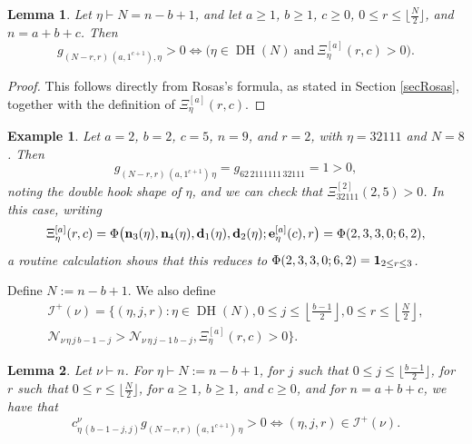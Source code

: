 \documentclass[12pt]{article}
\newtheorem{lemma}{Lemma}%
\newtheorem{example}{Example}
\begin{document}
\begin{lemma}\label{gposLem}
 Let $\eta \vdash N = n - b + 1$, and let $a \geq 1$, $b \geq 1$, $c \geq 0$, $0 \leq r \leq \lfloor \frac{N}{2} \rfloor$, 
 and $n = a + b + c$. Then 
\begin{equation*}
 g_{(N-r, r) \, (a, 1^{c+1}), \eta} > 0 \Longleftrightarrow 
 \big( \eta \in \operatorname{DH}(N) \ \text{and} \ {\Xi}^{[a]}_{\eta}(r,c) > 0 \big). 
\end{equation*}
\end{lemma}

 \begin{proof}
 This follows directly from Rosas's formula, as stated in Section \ref{secRosas}, together with the definition of $\Xi^{[a]}_\eta(r,c)$. 
\end{proof}

\begin{example}
 Let $a = 2$, $b = 2$, $c = 5$, $n=9$, and $r = 2$, with $\eta = 32111$ and $N = 8$. Then $$ g_{(N-r,r) \, (a, 1^{c+1} ) \, \eta } = g_{62 
 \, 2111111 \, 32111} = 1 > 0, $$ noting the double hook shape of $\eta$, and we can check that ${\Xi}^{[2]}_{32111}(2,5) > 0$. 
 In this case, writing $$ {\Xi}_{\eta}^{[a]}(r, c) = \Phi\big( \text{{\bf n}}_{3}(\eta), 
 \text{{\bf n}}_{4}(\eta), \text{{\bf d}}_{1}(\eta), \text{{\bf d}}_{2}(\eta); \text{{\bf e}}_{\eta}^{[a]}(c), r \big) = \Phi(2,3,3,0;6,2), $$ a 
 routine calculation shows that this reduces to $ \Phi(2,3,3,0;6,2) = \text{{\bf 1}}_{2 \leq r \leq 3}$.
\end{example}

 Define $N:= n - b + 1$. We also define 
\begin{multline*}
 \mathcal{I}^{+}(\nu) = \Bigg\{ (\eta, j, r) : \eta \in \operatorname{DH}(N), 
 0 \leq j \leq \left\lfloor \frac{b-1}{2} \right\rfloor, 
 0 \leq r \leq \left\lfloor \frac{N}{2} \right\rfloor, \\
 \mathcal{N}_{\nu \, \eta \, j \, b - 1 - j } > \mathcal{N}_{\nu \, \eta \, j - 1 \, b - j}, 
 {\Xi}^{[a]}_{\eta}(r, c) > 0 \Bigg\}.
\end{multline*}

\begin{lemma}\label{iffpos}
 Let $\nu \vdash n$. For $\eta \vdash N := n - b + 1$, for $j$ such that $0 \leq j \leq \lfloor \frac{b-1}{2} \rfloor$, for $r$ such that $0 
 \leq r \leq \lfloor \frac{N}{2} \rfloor$, for $a \geq 1$, $b \geq 1$, and 
 $c \geq 0$, and for $n = a + b + c$, we have that $$ c_{\eta \, (b - 
 1 - j, j)}^{\nu} g_{(N-r,r) \, (a, 1^{c+1}) \, \eta} > 0 \Longleftrightarrow (\eta, j, r) \in \mathcal{I}^{+}(\nu). $$
\end{lemma}
\end{document}

